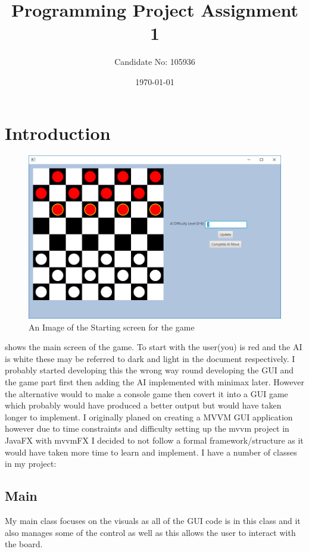 \documentclass[a4paper,12pt]{scrartcl}
\title{Programming Project Assignment 1}
\author{Candidate No: 105936}
\date{\today}
\begin{document}
	
	\begin{titlepage}
		\maketitle
	\end{titlepage}
	
	\tableofcontents
	\newpage
	\section{Introduction}
	{
		\begin{figure}[h]
			\centering
			\includegraphics[width=\textwidth]{checkersMain}
			\caption{An Image of the Starting screen for the game}
			\label{img:checkersMain}
		\end{figure}
		 shows the main screen of the game. To start with the user(you) is red and the AI is white these may be referred to dark and light in the document respectively. I probably started developing this the wrong way round developing the GUI and the game part first then adding the AI implemented with minimax later. However the alternative would to make a console game then covert it into a GUI game which probably would have produced a better output but would have taken longer to implement. I originally planed on creating a MVVM GUI application however due to time constraints and difficulty setting up the mvvm project in JavaFX with mvvmFX I decided to not follow a formal framework/structure as it would have taken more time to learn and implement. I have a number of classes in my project:
		\subsection{Main}{My main class focuses on the visuals as all of the GUI code is in this class and it also manages some of the control as well as this allows the user to interact with the board.}
}
\end{document}
